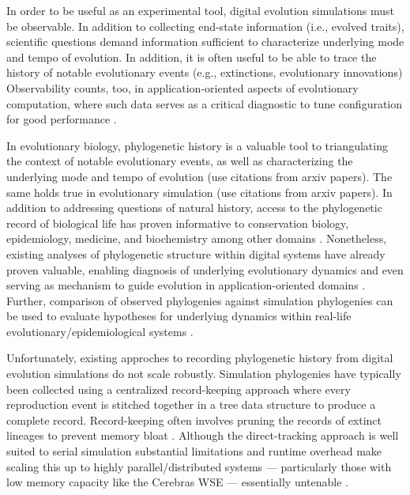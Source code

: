 In order to be useful as an experimental tool, digital evolution simulations must be observable.
In addition to collecting end-state information (i.e., evolved traits), scientific questions demand information sufficient to characterize underlying mode and tempo of evolution.
In addition, it is often useful to be able to trace the history of notable evolutionary events (e.g., extinctions, evolutionary innovations)
Observability counts, too, in application-oriented aspects of evolutionary computation, where such data serves as a critical diagnostic to tune configuration for good performance \citep{hernandez}.

In evolutionary biology, phylogenetic history is a valuable tool to triangulating the context of notable evolutionary events, as well as characterizing the underlying mode and tempo of evolution (use citations from arxiv papers).
The same holds true in evolutionary simulation (use citations from arxiv papers).
In addition to addressing questions of natural history, access to the phylogenetic record of biological life has proven informative to conservation biology, epidemiology, medicine, and biochemistry among other domains \citep{faithConservationEvaluationPhylogenetic1992, STAMATAKIS2005phylogenetics, frenchHostPhylogenyShapes2023,kim2006discovery}.
Nonetheless, existing analyses of phylogenetic structure within digital systems have already proven valuable, enabling diagnosis of underlying evolutionary dynamics \citep{moreno2023toward,hernandez2022can,shahbandegan2022untangling, lewinsohnStatedependentEvolutionaryModels2023a} and even serving as mechanism to guide evolution in application-oriented domains \citep{lalejini2024phylogeny,lalejini2024runtime,murphy2008simple,burke2003increased}.
Further, comparison of observed phylogenies against simulation phylogenies can be used to evaluate hypotheses for underlying dynamics within real-life evolutionary/epidemiological systems \citep{TODOtheGenevaHIVpaper}.

Unfortunately, existing approches to recording phylogenetic history from digital evolution simulations do not scale robustly.
Simulation phylogenies have typically been collected using a centralized record-keeping approach where every reproduction event is stitched together in a tree data structure to produce a complete record.
Record-keeping often involves pruning the records of extinct lineages to prevent memory bloat \citep{preprintTODO}.
Although the direct-tracking approach is well suited to serial simulation substantial limitations and runtime overhead make scaling this up to highly parallel/distributed systems --- particularly those with low memory capacity like the Cerebras WSE --- essentially untenable \citep{morenoTODOpreprint}.

